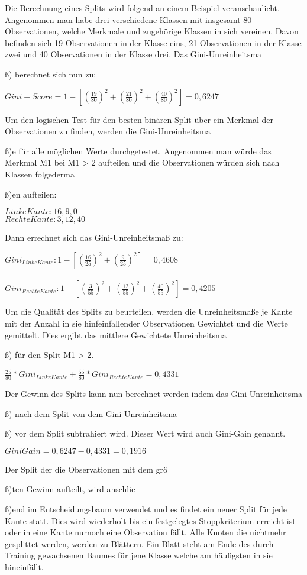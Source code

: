 Die Berechnung eines Splits wird folgend an einem Beispiel veranschaulicht.
Angenommen man habe drei verschiedene Klassen mit insgesamt 80 Observationen, welche Merkmale und zugeh{\"o}rige Klassen in sich vereinen.
Davon befinden sich 19 Observationen in der Klasse eins, 21 Observationen in der Klasse zwei und 40 Observationen in der Klasse drei. Das Gini-Unreinheitsma{\ss) berechnet sich nun zu:


$ Gini-Score = \displaystyle 1- [ (\frac{19}{80})^2 + (\frac{21}{80})^2 + (\frac{40}{80})^2] = 0,6247 $


Um den logischen Test f{\"u}r den besten bin{\"a}ren Split {\"u}ber ein Merkmal der Observationen zu finden, werden die Gini-Unreinheitsma{\ss)e f{\"u}r alle m{\"o}glichen Werte durchgetestet.
Angenommen man w{\"u}rde das Merkmal M1 bei M1 > 2 aufteilen und die Observationen w{\"u}rden sich nach Klassen folgederma{\ss)en aufteilen:

$Linke Kante: 16, 9, 0$\\
$Rechte Kante : 3, 12, 40$

Dann errechnet sich das Gini-Unreinheitsma{\ss} zu:

$Gini_{Linke Kante}:    \displaystyle 1 - [ (\frac{16}{25})^2 + (\frac{9}{25})^2] = 0,4608$\\
\\
$Gini_{Rechte Kante}:   \displaystyle 1 - [ (\frac{3}{55})^2 + (\frac{12}{55})^2+ (\frac{40}{55})^2] = 0,4205$

Um die Qualit{\"a}t des Splits zu beurteilen, werden die Unreinheitsma{\ss}e je Kante mit der Anzahl in sie hinfeinfallender Observationen Gewichtet und die Werte gemittelt. 
Dies ergibt das mittlere Gewichtete Unreinheitsma{\ss) f{\"u}r den Split M1 > 2.

${ \displaystyle \frac{25}{80} * Gini_{Linke Kante} + \frac{55}{80} * Gini_{Rechte Kante} = 0,4331}$

Der Gewinn des Splits kann nun berechnet werden indem das Gini-Unreinheitsma{\ss) nach dem Split von dem Gini-Unreinheitsma{\ss) vor dem Split subtrahiert wird. Dieser Wert wird auch Gini-Gain genannt. 

$ GiniGain = \displaystyle 0,6247 - 0,4331 = 0,1916$

Der Split der die Observationen mit dem gr{\"o}{\ss)ten Gewinn aufteilt, wird anschlie{\ss)end im Entscheidungsbaum verwendet und es findet ein neuer Split f{\"u}r jede Kante statt.
Dies wird wiederholt bis ein festgelegtes Stoppkriterium erreicht ist oder in eine Kante nurnoch eine Observation f{\"a}llt. Alle Knoten die nichtmehr gesplittet werden, werden zu Bl{\"a}ttern.
Ein Blatt steht am Ende des durch Training gewachsenen Baumes f{\"u}r jene Klasse welche am h{\"a}ufigsten in sie hineinf{\"a}llt.

}}}}}}}}
